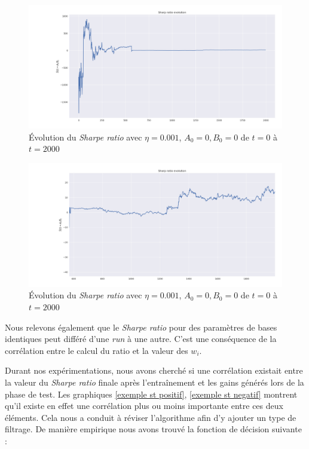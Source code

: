 \documentclass[a4paper, 11pt]{article}
\begin{document}
 \begin{figure}[H]
 	\centering
 	\includegraphics[scale=0.35]{res/Sharpe_ratio_evolution_big}
 	\caption{Évolution du \textit{Sharpe ratio} avec $\eta = 0.001$, $A_0 = 0, B_0 = 0$ de $t=0$ à $t=2000$}
  	\label{sharpe ratio eta=0.001 zoomé}
 \end{figure} 
 
 \begin{figure}[H]
 	\centering
 	\includegraphics[scale=0.35]{res/Sharpe_ratio_evolution_small}
 	\caption{Évolution du \textit{Sharpe ratio} avec $\eta = 0.001$, $A_0 = 0, B_0 = 0$ de $t=0$ à $t=2000$}
  	\label{sharpe ratio eta=0.001 zoomé 2}
 \end{figure} 
 
 Nous relevons également que le \textit{Sharpe ratio} pour des paramètres de bases identiques peut différé d'une \textit{run} à une autre. C'est une conséquence de la corrélation entre le calcul du ratio et la valeur des $w_i$.
 
Durant nos expérimentations, nous avons cherché si une corrélation existait entre la valeur du \textit{Sharpe ratio} finale après l'entraînement et les gains générés lors de la phase de test. Les graphiques \ref{exemple st positif}, \ref{exemple st negatif} montrent qu'il existe en effet une corrélation plus ou moins importante entre ces deux éléments. Cela nous a conduit à réviser l'algorithme afin d'y ajouter un type de filtrage. De manière empirique nous avons trouvé la fonction de décision suivante :
\end{document}
